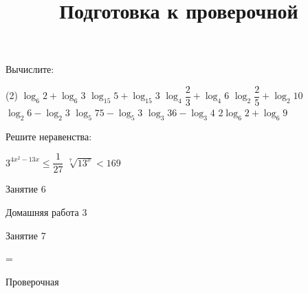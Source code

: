 \begin{class}[number=5]
\begin{listofex}[resume]
		\item Вычислите:
		\begin{tasks}(2)
			\task \( \log_6 2 + \log_6 3 \)
			\task \( \log_{15} 5 + \log_{15} 3 \)
			\task \( \log_4 \dfrac{2}{3} + \log_4 6 \)
			\task \( \log_2 \dfrac{2}{5} + \log_2 10 \)
			\task \( \log_2 6 - \log_2 3 \)
			\task \( \log_5 75 - \log_5 3 \)
			\task \( \log_3 36 - \log_3 4 \)
			\task \( 2\log_6 2 + \log_6 9 \)
		\end{tasks}
		\item Решите неравенства:
		\begin{tasks}
			\task \( 3^{4x^2-13x} \le \dfrac{ 1 }{ 27 } \)
			\task \(\sqrt[7]{13^x} < 169  \)
		\end{tasks}
	\end{listofex}
\end{class}

\begin{class}[number=6]
	\begin{listofex}
		\item Занятие 6
	\end{listofex}
\end{class}

\begin{homework}[number=3]
	\begin{listofex}
		\item Домашняя работа 3
	\end{listofex}
\end{homework}

\begin{class}[number=7]
	\title{Подготовка к проверочной}
	\begin{listofex}
		\item Занятие 7
	\end{listofex}
\end{class}

=%
\begin{exam}
	\begin{listofex}
		\item Проверочная
	\end{listofex}
\end{exam}
